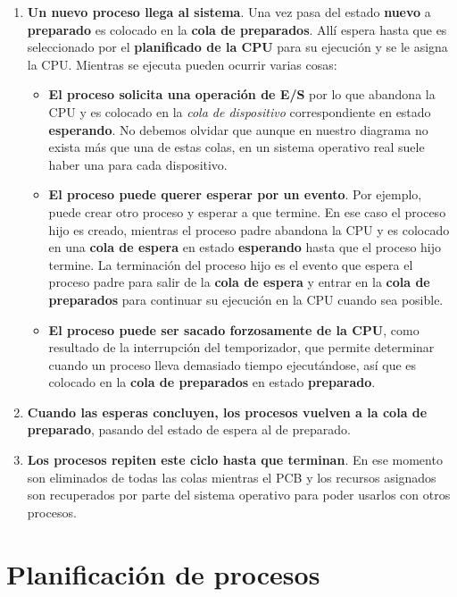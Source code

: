 \begin{enumerate}
\def\labelenumi{\arabic{enumi}.}
\item
  \textbf{Un nuevo proceso llega al sistema}. Una vez pasa del estado
  \textbf{nuevo} a \textbf{preparado} es colocado en la \textbf{cola de
  preparados}. Allí espera hasta que es seleccionado por el
  \textbf{planificado de la CPU} para su ejecución y se le asigna la
  CPU. Mientras se ejecuta pueden ocurrir varias cosas:

  \begin{itemize}
  \item
    \textbf{El proceso solicita una operación de E/S} por lo que
    abandona la CPU y es colocado en la \emph{cola de dispositivo}
    correspondiente en estado \textbf{esperando}. No debemos olvidar que
    aunque en nuestro diagrama no exista más que una de estas colas, en
    un sistema operativo real suele haber una para cada dispositivo.
  \item
    \textbf{El proceso puede querer esperar por un evento}. Por ejemplo,
    puede crear otro proceso y esperar a que termine. En ese caso el
    proceso hijo es creado, mientras el proceso padre abandona la CPU y
    es colocado en una \textbf{cola de espera} en estado
    \textbf{esperando} hasta que el proceso hijo termine. La terminación
    del proceso hijo es el evento que espera el proceso padre para salir
    de la \textbf{cola de espera} y entrar en la \textbf{cola de
    preparados} para continuar su ejecución en la CPU cuando sea
    posible.
  \item
    \textbf{El proceso puede ser sacado forzosamente de la CPU}, como
    resultado de la interrupción del temporizador, que permite
    determinar cuando un proceso lleva demasiado tiempo ejecutándose,
    así que es colocado en la \textbf{cola de preparados} en estado
    \textbf{preparado}.
  \end{itemize}
\item
  \textbf{Cuando las esperas concluyen, los procesos vuelven a la cola
  de preparado}, pasando del estado de espera al de preparado.
\item
  \textbf{Los procesos repiten este ciclo hasta que terminan}. En ese
  momento son eliminados de todas las colas mientras el PCB y los
  recursos asignados son recuperados por parte del sistema operativo
  para poder usarlos con otros procesos.
\end{enumerate}

\section{Planificación de procesos}\label{_planificacion_de_procesos}

